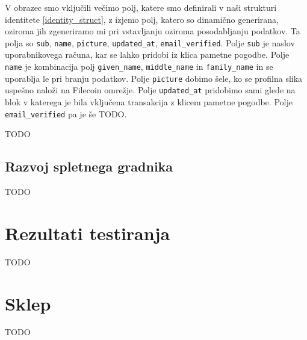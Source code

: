 \documentclass[a4paper,12pt,openright]{book}
\begin{document}
V obrazec smo vključili večimo polj, katere smo definirali v naši strukturi identitete \ref{identity_struct}, z izjemo polj,
katero so dinamično generirana, oziroma jih zgeneriramo mi pri vstavljanju oziroma posodabljanju podatkov.
Ta polja so \lstinline{sub}, \lstinline{name}, \lstinline{picture}, \lstinline{updated_at}, \lstinline{email_verified}.
Polje \lstinline{sub} je naslov uporabnikovega računa, kar se lahko pridobi iz klica pametne pogodbe.
Polje \lstinline{name} je kombinacija polj \lstinline{given_name}, \lstinline{middle_name} in \lstinline{family_name} in se uporablja le pri branju podatkov.
Polje \lstinline{picture} dobimo šele, ko se profilna slika uspešno naloži na Filecoin omrežje.
Polje \lstinline{updated_at} pridobimo sami glede na blok v katerega je bila vključena transakcija z klicem pametne pogodbe.
Polje \lstinline{email_verified} pa je še TODO.

TODO


\section{Razvoj spletnega gradnika}
TODO



\chapter{Rezultati testiranja}
TODO


\chapter{Sklep}
TODO




\printbibliography[heading=bibintoc,type=article,title={Članki v revijah}]

\printbibliography[heading=bibintoc,type=inproceedings,title={Članki v zbornikih}]

\printbibliography[heading=bibintoc,type=incollection,title={Poglavja v knjigah}]

\printbibliography[heading=bibintoc,title={Celotna literatura}]
\end{document}

